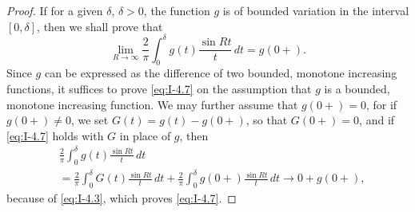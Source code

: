 \begin{proof}
If for a given $\delta$, $\delta>0$, the function $g$ is of bounded variation in the interval $[0,\delta]$, then we shall prove that
\begin{equation}\label{eq:I-4.7}
\lim_{R\to\infty}\frac{2}{\pi}\int_0^\delta g(t)\frac{\sin Rt}{t}\,dt=g(0+).
\end{equation}
Since $g$ can be expressed as the difference of two bounded, monotone increasing functions, it suffices to prove \eqref{eq:I-4.7} on the assumption that $g$ is a bounded, monotone increasing function. We may further assume that $g(0+)=0$, for if $g(0+)\neq 0$, we set $G(t)=g(t)-g(0+)$, so that $G(0+)=0$, and if \eqref{eq:I-4.7} holds with $G$ in place of $g$, then
\begin{equation*}
\begin{aligned}
&\frac{2}{\pi}  \int_0^\delta g(t)\frac{\sin Rt}{t}\,dt\\
&= \frac{2}{\pi}  \int_0^\delta G(t)\frac{\sin Rt}{t}\,dt + \frac{2}{\pi}  \int_0^\delta g(0+)\frac{\sin Rt}{t}\,dt \to 0 + g(0+),
\end{aligned}
\end{equation*}
because of \eqref{eq:I-4.3}, which proves \eqref{eq:I-4.7}.


\end{proof}
